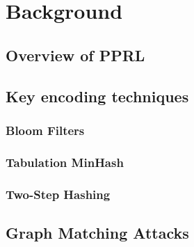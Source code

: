 
\chapter{Background}  \label{sec:background}

\section{Overview of PPRL}  \label{sec:block-ciphers}

\section{Key encoding techniques}

\subsection{Bloom Filters}

\subsection{Tabulation MinHash}

\subsection{Two-Step Hashing}

\section{Graph Matching Attacks}

